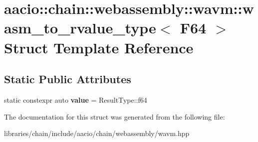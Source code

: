 \hypertarget{structaacio_1_1chain_1_1webassembly_1_1wavm_1_1wasm__to__rvalue__type_3_01_f64_01_4}{}\section{aacio\+:\+:chain\+:\+:webassembly\+:\+:wavm\+:\+:wasm\+\_\+to\+\_\+rvalue\+\_\+type$<$ F64 $>$ Struct Template Reference}
\label{structaacio_1_1chain_1_1webassembly_1_1wavm_1_1wasm__to__rvalue__type_3_01_f64_01_4}
\subsection*{Static Public Attributes}
\begin{DoxyCompactItemize}
\item 
\mbox{\label{structaacio_1_1chain_1_1webassembly_1_1wavm_1_1wasm__to__rvalue__type_3_01_f64_01_4_ad8c71690c3cd8bbf6231e9b62370a948}} 
static constexpr auto {\bfseries value} = Result\+Type\+::f64
\end{DoxyCompactItemize}


The documentation for this struct was generated from the following file\+:\begin{DoxyCompactItemize}
\item 
libraries/chain/include/aacio/chain/webassembly/wavm.\+hpp\end{DoxyCompactItemize}

